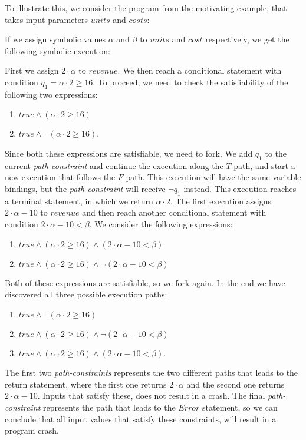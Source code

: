 		To illustrate this, we consider the program from the motivating example, that takes input parameters $units$ and $costs$:
		
		\motexample{}
		
		If we assign symbolic values $\alpha$ and $\beta$ to $units$ and $cost$ respectively, we get the following symbolic execution:
		
		First we assign $2\cdot \alpha$ to $revenue$. We then reach a conditional statement with condition $q_1 = \alpha \cdot 2 \geq 16$. To proceed, we need to check the satisfiability of the following two expressions:
		\begin{enumerate}
			\item $true \land (\alpha \cdot 2 \geq 16)$
			\item $true \land \neg (\alpha \cdot 2 \geq 16)$.
		\end{enumerate}
		Since both these expressions are satisfiable, we need to fork. We add $q_1$ to the current \emph{path-constraint} and continue the execution along the $T$ path, and start a new execution that follows the $F$ path. This execution will have the same variable bindings, but the \emph{path-constraint} will receive $\neg q_1$ instead.
		This execution reaches a terminal statement, in which we return $\alpha \cdot 2$. The first execution assigns $2\cdot \alpha - 10$ to $revenue$ and then reach another conditional statement with condition $2\cdot \alpha - 10 < \beta$. We consider the following expressions:
		\begin{enumerate}
			\item $true \land (\alpha \cdot 2 \geq 16) \land (2\cdot \alpha - 10 < \beta)$
			\item $true \land (\alpha \cdot 2 \geq 16) \land \neg (2\cdot \alpha - 10 < \beta)$
		\end{enumerate}
		Both of these expressions are satisfiable, so we fork again. In the end we have discovered all three possible execution paths:
		\begin{enumerate}
			\item $true \land \neg (\alpha \cdot 2 \geq 16)$
			\item $true \land (\alpha \cdot 2 \geq 16) \land \neg (2\cdot \alpha - 10 < \beta)$
			\item $true \land (\alpha \cdot 2 \geq 16) \land (2\cdot \alpha - 10 < \beta)$.
		\end{enumerate}
		
		The first two \emph{path-constraints} represents the two different paths that leads to the return statement, where the first one returns $2\cdot \alpha$ and the second one returns $2\cdot \alpha - 10$. Inputs that satisfy these, does not result in a crash.
		The final \emph{path-constraint} represents the path that leads to the $Error$ statement, so we can conclude that all input values that satisfy these constraints, will result in a program crash.
	
